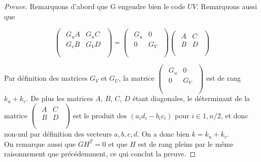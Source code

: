 \documentclass[12pt]{article}
\theoremstyle{definition}
\begin{document}
\begin{proof}[Preuve]
Remarquons d'abord que G engendre bien le code $UV$. Remarquons aussi que 

$$
\begin{pmatrix}
\begin{array}{c|c}
G_uA & G_uC \\
 \hline 
G_vB & G_VD \\
\end{array} \\
\end{pmatrix}
= 
\begin{pmatrix}
\begin{array}{c|c}
G_u & 0 \\
 \hline 
0 & G_V \\
\end{array} \\
\end{pmatrix} 
\begin{pmatrix}
\begin{array}{c|c}
A & C \\
 \hline 
B & D \\
\end{array} \\
\end{pmatrix}
$$

Par définition des matrices $G_V$ et $G_U$, la matrice $ 
\begin{pmatrix}
\begin{array}{c|c}
G_u & 0 \\
 \hline 
0 & G_V \\
\end{array} \\
\end{pmatrix} $ est de rang $k_u + k_v$. De plus les matrices $A$, $B$, $C$, $D$ étant diagonales, le déterminant de la matrice $\begin{pmatrix}
\begin{array}{c|c}
A & C \\
 \hline 
B & D \\
\end{array} \\
\end{pmatrix}$
est le produit des $(a_id_i - b_ic_i)$ pour $i \in {1, n/2}$, et donc non-nul par définition des vecteurs $a,b,c,d$. On a donc bien $k = k_u + k_v$. \\
On remarque aussi que $GH^T = 0$ et que $H$ est de rang pleins par le même raisonnement que précédemment, ce qui conclut la preuve.
\end{proof}
\end{document}
